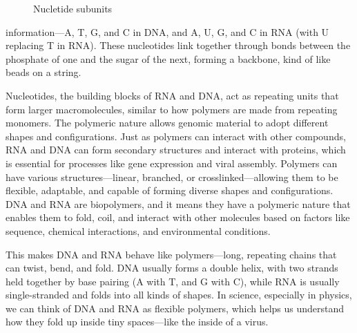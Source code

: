 \documentclass[12pt]{article}
\begin{document}
\begin{flushleft}
\begin{figure}[!ht]
  \centering
  

  \caption{Nucletide subunits}
\end{figure}


\noindent information—A, T, G, and C in DNA, and A, U, G, and C in RNA (with U replacing T in RNA). These nucleotides link together through bonds between the phosphate of one and the sugar of the next, forming a backbone, kind of like beads on a string. 





Nucleotides, the building blocks of RNA and DNA, act as repeating units  that form larger macromolecules, similar to how polymers are made from repeating monomers. The polymeric nature allows genomic material to adopt different shapes and configurations. Just as polymers can interact with other compounds, RNA and DNA can form secondary structures and interact with proteins, which is essential for processes like gene expression and viral assembly. Polymers can have various structures—linear, branched, or crosslinked—allowing them to be flexible, adaptable, and capable of forming diverse shapes and configurations.  DNA and RNA are biopolymers, and it means they have a polymeric nature that enables them to fold, coil, and interact with other molecules based on factors like sequence, chemical interactions, and environmental conditions.



This makes DNA and RNA behave like polymers—long, repeating chains that can twist, bend, and fold. DNA usually forms a double helix, with two strands held together by base pairing (A with T, and G with C), while RNA is usually single-stranded and folds into all kinds of shapes. In science, especially in physics, we can think of DNA and RNA as flexible polymers, which helps us understand how they fold up inside tiny spaces—like the inside of a virus.




\end{flushleft}
\end{document}
